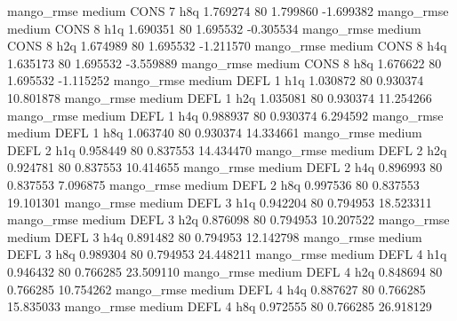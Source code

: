       mango_rmse     medium     CONS                 7                  h8q  1.769274 80       1.799860          -1.699382
       mango_rmse     medium     CONS                 8                  h1q  1.690351 80       1.695532          -0.305534
       mango_rmse     medium     CONS                 8                  h2q  1.674989 80       1.695532          -1.211570
       mango_rmse     medium     CONS                 8                  h4q  1.635173 80       1.695532          -3.559889
       mango_rmse     medium     CONS                 8                  h8q  1.676622 80       1.695532          -1.115252
       mango_rmse     medium     DEFL                 1                  h1q  1.030872 80       0.930374          10.801878
       mango_rmse     medium     DEFL                 1                  h2q  1.035081 80       0.930374          11.254266
       mango_rmse     medium     DEFL                 1                  h4q  0.988937 80       0.930374           6.294592
       mango_rmse     medium     DEFL                 1                  h8q  1.063740 80       0.930374          14.334661
       mango_rmse     medium     DEFL                 2                  h1q  0.958449 80       0.837553          14.434470
       mango_rmse     medium     DEFL                 2                  h2q  0.924781 80       0.837553          10.414655
       mango_rmse     medium     DEFL                 2                  h4q  0.896993 80       0.837553           7.096875
       mango_rmse     medium     DEFL                 2                  h8q  0.997536 80       0.837553          19.101301
       mango_rmse     medium     DEFL                 3                  h1q  0.942204 80       0.794953          18.523311
       mango_rmse     medium     DEFL                 3                  h2q  0.876098 80       0.794953          10.207522
       mango_rmse     medium     DEFL                 3                  h4q  0.891482 80       0.794953          12.142798
       mango_rmse     medium     DEFL                 3                  h8q  0.989304 80       0.794953          24.448211
       mango_rmse     medium     DEFL                 4                  h1q  0.946432 80       0.766285          23.509110
       mango_rmse     medium     DEFL                 4                  h2q  0.848694 80       0.766285          10.754262
       mango_rmse     medium     DEFL                 4                  h4q  0.887627 80       0.766285          15.835033
       mango_rmse     medium     DEFL                 4                  h8q  0.972555 80       0.766285          26.918129
